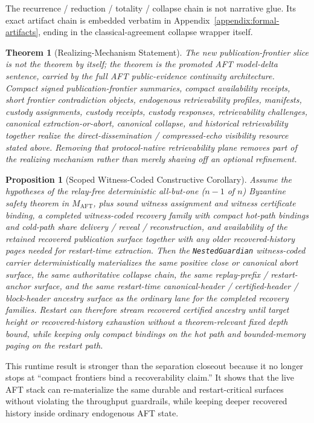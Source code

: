 \documentclass[11pt]{article}
\newtheorem{theorem}{Theorem}
\newtheorem{proposition}{Proposition}
\newcommand{\AFT}{\textsc{AFT}}
\newcommand{\code}[1]{\texttt{#1}}
\begin{document}
The recurrence / reduction / totality / collapse chain is not narrative glue.
Its exact artifact chain is embedded verbatim in
Appendix~\ref{appendix:formal-artifacts}, ending in the classical-agreement
collapse wrapper itself.

\begin{theorem}[Realizing-Mechanism Statement]
The new publication-frontier slice is not the theorem by itself; the theorem is
the promoted AFT model-delta sentence, carried by the full \AFT{}
public-evidence continuity architecture. Compact
signed publication-frontier summaries, compact availability receipts, short
frontier contradiction objects, endogenous retrievability profiles, manifests,
custody assignments, custody receipts, custody responses, retrievability
challenges, canonical extraction-or-abort, canonical collapse, and historical
retrievability together realize the direct-dissemination / compressed-echo
visibility resource stated above. Removing that
protocol-native retrievability plane removes part of the realizing mechanism
rather than merely shaving off an optional refinement.
\end{theorem}

\begin{proposition}[Scoped Witness-Coded Constructive Corollary]
Assume the hypotheses of the relay-free deterministic
all-but-one (\(n-1\) of \(n\)) Byzantine safety theorem in \(M_{\mathrm{AFT}}\), plus sound witness assignment and witness
certificate binding, a completed witness-coded recovery family with compact
hot-path bindings and cold-path share delivery / reveal / reconstruction, and
availability of the retained recovered publication surface together with any
older recovered-history pages needed for restart-time extraction. Then the
\code{NestedGuardian} witness-coded carrier deterministically materializes the
same positive close or canonical abort surface, the same authoritative
collapse chain, the same replay-prefix / restart-anchor surface, and the same
restart-time canonical-header / certified-header / block-header ancestry
surface as the ordinary lane for the completed recovery families. Restart can
therefore stream recovered certified ancestry until target height or
recovered-history exhaustion without a theorem-relevant fixed depth bound,
while keeping only compact bindings on the hot path and bounded-memory paging
on the restart path.
\end{proposition}

This runtime result is stronger than the separation closeout because it no
longer stops at ``compact frontiers bind a recoverability claim.'' It shows
that the live AFT stack can re-materialize the same durable and
restart-critical surfaces without violating the throughput guardrails, while
keeping deeper recovered history inside ordinary endogenous AFT state.
\end{document}
